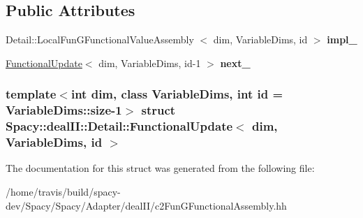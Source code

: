 \subsection*{\-Public \-Attributes}
\begin{DoxyCompactItemize}
\item 
\hypertarget{structSpacy_1_1dealII_1_1Detail_1_1FunctionalUpdate_a17984953c116ffca56b7dbbbed2fb1ef}{\-Detail\-::\-Local\-Fun\-G\-Functional\-Value\-Assembly\*
$<$ dim, \-Variable\-Dims, id $>$ {\bfseries impl\-\_\-}}\label{structSpacy_1_1dealII_1_1Detail_1_1FunctionalUpdate_a17984953c116ffca56b7dbbbed2fb1ef}

\item 
\hypertarget{structSpacy_1_1dealII_1_1Detail_1_1FunctionalUpdate_a91c4b680dd99989d65d39db564ae18d3}{\hyperlink{structSpacy_1_1dealII_1_1Detail_1_1FunctionalUpdate}{\-Functional\-Update}$<$ dim, \*
\-Variable\-Dims, id-\/1 $>$ {\bfseries next\-\_\-}}\label{structSpacy_1_1dealII_1_1Detail_1_1FunctionalUpdate_a91c4b680dd99989d65d39db564ae18d3}

\end{DoxyCompactItemize}
\subsubsection*{template$<$int dim, class \-Variable\-Dims, int id = \-Variable\-Dims\-::size-\/1$>$ struct Spacy\-::deal\-I\-I\-::\-Detail\-::\-Functional\-Update$<$ dim, Variable\-Dims, id $>$}



\-The documentation for this struct was generated from the following file\-:\begin{DoxyCompactItemize}
\item 
/home/travis/build/spacy-\/dev/\-Spacy/\-Spacy/\-Adapter/deal\-I\-I/c2\-Fun\-G\-Functional\-Assembly.\-hh\end{DoxyCompactItemize}
